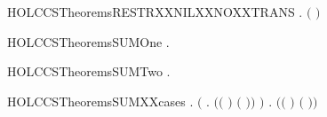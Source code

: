 \begin{SaveVerbatim}{HOLCCSTheoremsRESTRXXNILXXNOXXTRANS}
\HOLTokenTurnstile{} \HOLSymConst{\HOLTokenForall{}}  . \HOLSymConst{\HOLTokenNeg{}}\ensuremath{(}   \HOLTokenTransBegin{}\HOLTokenTransEnd {}\ensuremath{)}
\end{SaveVerbatim}
\newcommand{\HOLCCSTheoremsRESTRXXNILXXNOXXTRANS}{\UseVerbatim{HOLCCSTheoremsRESTRXXNILXXNOXXTRANS}}
\begin{SaveVerbatim}{HOLCCSTheoremsSUMOne}
\HOLTokenTurnstile{} \HOLSymConst{\HOLTokenForall{}}   .  \HOLTokenTransBegin{}\HOLTokenTransEnd {} \HOLSymConst{\HOLTokenImp{}}  \HOLSymConst{\ensuremath{+}}  \HOLTokenTransBegin{}\HOLTokenTransEnd {}
\end{SaveVerbatim}
\newcommand{\HOLCCSTheoremsSUMOne}{\UseVerbatim{HOLCCSTheoremsSUMOne}}
\begin{SaveVerbatim}{HOLCCSTheoremsSUMTwo}
\HOLTokenTurnstile{} \HOLSymConst{\HOLTokenForall{}}   .  \HOLTokenTransBegin{}\HOLTokenTransEnd {} \HOLSymConst{\HOLTokenImp{}}  \HOLSymConst{\ensuremath{+}}  \HOLTokenTransBegin{}\HOLTokenTransEnd {}
\end{SaveVerbatim}
\newcommand{\HOLCCSTheoremsSUMTwo}{\UseVerbatim{HOLCCSTheoremsSUMTwo}}
\begin{SaveVerbatim}{HOLCCSTheoremsSUMXXcases}
\HOLTokenTurnstile{} \HOLSymConst{\HOLTokenForall{}}   .
        \HOLSymConst{\ensuremath{+}}  \HOLTokenTransBegin{}\HOLTokenTransEnd {} \HOLSymConst{\HOLTokenImp{}}
       \ensuremath{(}\HOLSymConst{\HOLTokenExists{}} . \ensuremath{(}\ensuremath{(} \HOLSymConst{\ensuremath{=}} \ensuremath{)} \HOLSymConst{\HOLTokenConj{}} \ensuremath{(} \HOLSymConst{\ensuremath{=}} \ensuremath{)}\ensuremath{)} \HOLSymConst{\HOLTokenConj{}}  \HOLTokenTransBegin{}\HOLTokenTransEnd {}\ensuremath{)} \HOLSymConst{\HOLTokenDisj{}}
       \HOLSymConst{\HOLTokenExists{}} . \ensuremath{(}\ensuremath{(} \HOLSymConst{\ensuremath{=}} \ensuremath{)} \HOLSymConst{\HOLTokenConj{}} \ensuremath{(} \HOLSymConst{\ensuremath{=}} \ensuremath{)}\ensuremath{)} \HOLSymConst{\HOLTokenConj{}}  \HOLTokenTransBegin{}\HOLTokenTransEnd {}
\end{SaveVerbatim}
